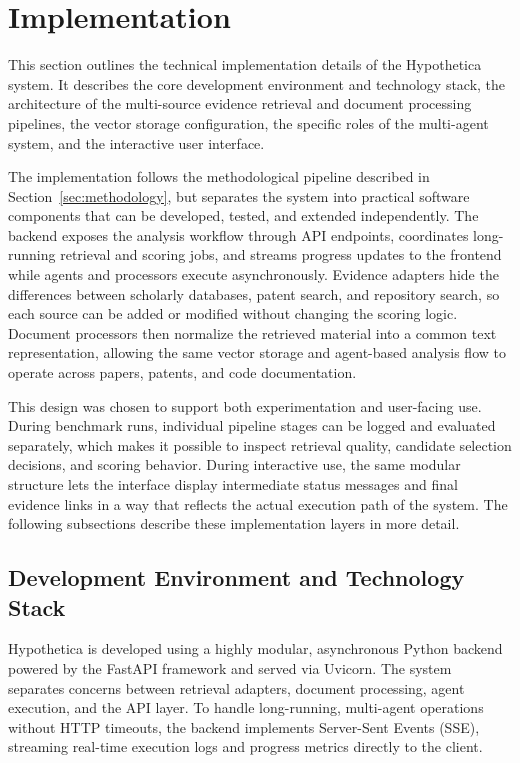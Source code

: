 \section{Implementation}
\label{sec:implementation}

This section outlines the technical implementation details of the Hypothetica system. It describes the core development environment and technology stack, the architecture of the multi-source evidence retrieval and document processing pipelines, the vector storage configuration, the specific roles of the multi-agent system, and the interactive user interface.

The implementation follows the methodological pipeline described in Section~\ref{sec:methodology}, but separates the system into practical software components that can be developed, tested, and extended independently. The backend exposes the analysis workflow through API endpoints, coordinates long-running retrieval and scoring jobs, and streams progress updates to the frontend while agents and processors execute asynchronously. Evidence adapters hide the differences between scholarly databases, patent search, and repository search, so each source can be added or modified without changing the scoring logic. Document processors then normalize the retrieved material into a common text representation, allowing the same vector storage and agent-based analysis flow to operate across papers, patents, and code documentation.

This design was chosen to support both experimentation and user-facing use. During benchmark runs, individual pipeline stages can be logged and evaluated separately, which makes it possible to inspect retrieval quality, candidate selection decisions, and scoring behavior. During interactive use, the same modular structure lets the interface display intermediate status messages and final evidence links in a way that reflects the actual execution path of the system. The following subsections describe these implementation layers in more detail.

\subsection{Development Environment and Technology Stack}

Hypothetica is developed using a highly modular, asynchronous Python backend powered by the FastAPI framework and served via Uvicorn. The system separates concerns between retrieval adapters, document processing, agent execution, and the API layer. To handle long-running, multi-agent operations without HTTP timeouts, the backend implements Server-Sent Events (SSE), streaming real-time execution logs and progress metrics directly to the client.

